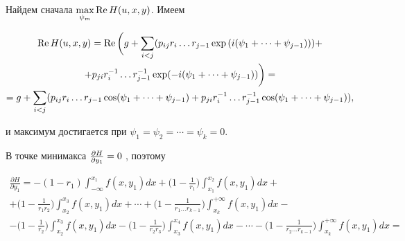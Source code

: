 \begin{pf}


Найдем сначала $\max\limits_{\psi_m} \operatorname{Re} H(u,x,y)$. Имеем


\begin{multline*}


\re H(u,x,y)=\re


\bigg(g+\sum_{i<j}(p_{ij}r_i\dotsc r_{j-1}


\exp{(i(\psi_1+\dotsb +\psi_{j-1})))}+\\


%


+p_{ji}r_i^{-1}\dotsc r_{j-1}^{-1}


\exp(-i(\psi_1+\dotsb +\psi_{j-1}))\bigg) =\\


%


=g+\sum_{i<j}(p_{ij}r_i\dotsc r_{j-1}\cos(\psi_1+\dotsb +\psi_{j-1})+


p_{ji}r_i^{-1}\dotsc r_{j-1}^{-1}\cos(\psi_1+\dotsb +\psi_{j-1})),


\end{multline*}


и максимум достигается при $\psi_1=\psi_2=\dotsb=\psi_k=0.$





В точке минимакса ${{\partial H}\over {\partial y_1}}=0\;$, поэтому


\begin{multline*}


\frac{\partial H}{\partial y_1}=-(1-r_1)


\int_{-\infty}^{x_1} f(x,y_1)dx+


\bigg(1-\frac{1}{r_1}\bigg)\int_{x_1}^{x_2}f(x,y_1)dx+\\


%


+\bigg(1-\frac{1}{r_1r_2}\bigg)\int_{x_2}^{x_3}f(x,y_1)dx+\dotsb +


\bigg(1-\frac{1}{r_1\dotsc r_{k-1}}\bigg)\int_{x_k}^{+\infty}f(x,y_1)dx-\\


%


-\bigg(1-\frac{1}{r_2}\bigg)\int_{x_2}^{x_3}f(x,y_1)dx-


\bigg(1-\frac{1}{r_2r_3}\bigg)\int_{x_3}^{x_4}f(x,y_1)dx-\dotsb -


\bigg(1-\frac{1}{r_2\dotsc r_{k-1}}\bigg)\int_{x_k}^{+\infty}f(x,y_1)dx=\\


%



\end{multline*}
\end{pf}

